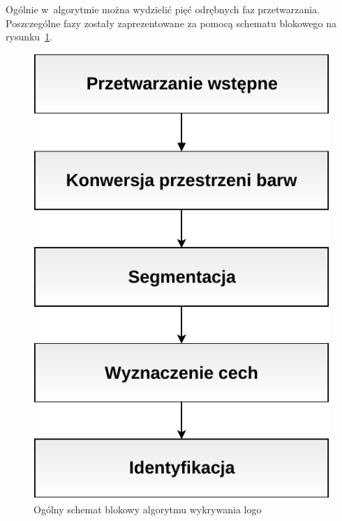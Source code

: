 
Ogólnie w~algorytmie można wydzielić pięć odrębnych faz przetwarzania. Poszczególne fazy zostały zaprezentowane za pomocą schematu blokowego na rysunku~\ref{fig:algorithm-overview}.

\begin{figure}
    \centering
    \includegraphics[width=0.55\columnwidth]{figures/algorithmOverview.pdf}
    \caption{Ogólny schemat blokowy algorytmu wykrywania logo \bk}
    \label{fig:algorithm-overview}
\end{figure}
